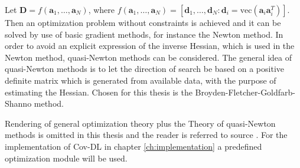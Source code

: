 Let $\textbf{D} = f(\textbf{a}_1, \hdots, \textbf{a}_N)$, where $f(\textbf{a}_1, \hdots, \textbf{a}_N) = \left[\textbf{d}_1, \hdots, \textbf{d}_N : \textbf{d}_i = \text{vec}(\textbf{a}_i\textbf{a}_i^T) \right] $. Then an optimization problem without constraints is achieved and it can be solved by use of basic gradient methods, for instance the Newton method. In order to avoid an explicit expression of the inverse Hessian, which is used in the Newton method, quasi-Newton methods can be considered\cite{Optimization2007}.  
The general idea of quasi-Newton methods is to let the direction of search be based on a positive definite matrix which is generated from available data, with the purpose of estimating the Hessian. 
Chosen for this thesis is the Broyden-Fletcher-Goldfarb-Shanno method.

Rendering of general optimization theory plus the Theory of quasi-Newton methods is omitted in this thesis and the reader is referred to source \cite{Optimization2007}.
For the implementation of Cov-DL in chapter \ref{ch:implementation} a predefined optimization module will be used.   
   

